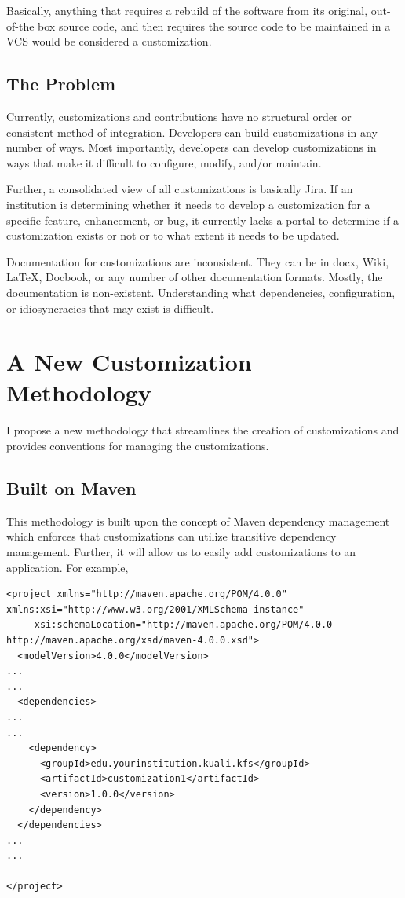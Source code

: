 \documentclass[12pt]{report}
\begin{document}
Basically, anything that requires a rebuild of the software from its original, out-of-the box source code, and then requires the
source code to be maintained in a VCS would be considered a customization.

\subsection{The Problem}

Currently, customizations and contributions have no structural order or consistent method of integration. Developers can build
customizations in any number of ways. Most importantly, developers can develop customizations in ways that make it difficult to 
configure, modify, and/or maintain. 

Further, a consolidated view of all customizations is basically Jira. If an institution is determining whether it needs to develop
a customization for a specific feature, enhancement, or bug, it currently lacks a portal to determine if a customization exists
or not or to what extent it needs to be updated.

Documentation for customizations are inconsistent. They can be in docx, Wiki, LaTeX, Docbook, or any number of other documentation 
formats. Mostly, the documentation is non-existent. Understanding what dependencies, configuration, or idiosyncracies that may exist
is difficult.

\section{A New Customization Methodology}

I propose a new methodology that streamlines the creation of customizations and provides conventions for managing the customizations.

\subsection{Built on Maven}

This methodology is built upon the concept of Maven dependency management which enforces that customizations can utilize transitive 
dependency management. Further, it will allow us to easily add customizations to an application. For example,

\begin{verbatim}
<project xmlns="http://maven.apache.org/POM/4.0.0" xmlns:xsi="http://www.w3.org/2001/XMLSchema-instance"
	 xsi:schemaLocation="http://maven.apache.org/POM/4.0.0 http://maven.apache.org/xsd/maven-4.0.0.xsd">
  <modelVersion>4.0.0</modelVersion>
...
...
  <dependencies>
...
...
    <dependency>
      <groupId>edu.yourinstitution.kuali.kfs</groupId>
      <artifactId>customization1</artifactId>
      <version>1.0.0</version>
    </dependency>
  </dependencies>
...
...

</project>
\end{verbatim}
\end{document}
